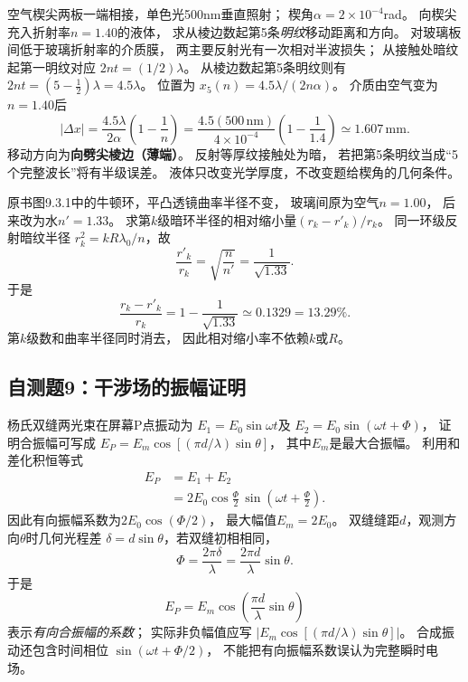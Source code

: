 \problemtext 空气楔尖两板一端相接，单色光500nm垂直照射；
楔角$\alpha=2\times10^{-4}$rad。
向楔尖充入折射率$n=1.40$的液体，
求从棱边数起第5条\emph{明纹}移动距离和方向。
\workings
对玻璃板间低于玻璃折射率的介质膜，
两主要反射光有一次相对半波损失；
从接触处暗纹起第一明纹对应
$2nt=(1/2)\lambda$。
从棱边数起第5条明纹则有
$2nt=(5-\tfrac12)\lambda=4.5\lambda$。
位置为
$x_5(n)=4.5\lambda/(2n\alpha)$。
介质由空气变为$n=1.40$后
\[
\boxed{|\Delta x|
=\frac{4.5\lambda}{2\alpha}\left(1-\frac1n\right)
=\frac{4.5(500\,\mathrm{nm})}{4\times10^{-4}}
 \left(1-\frac1{1.4}\right)
\simeq1.607\,\mathrm{mm}}.
\]
移动方向为\textbf{向劈尖棱边（薄端）}。
\crosscheck 反射等厚纹接触处为暗，
若把第5条明纹当成“5个完整波长”将有半级误差。
液体只改变光学厚度，不改变题给楔角的几何条件。

\problemtext 原书图9.3.1中的牛顿环，平凸透镜曲率半径不变，
玻璃间原为空气$n=1.00$，
后来改为水$n'=1.33$。
求第$k$级暗环半径的相对缩小量$(r_k-r'_k)/r_k$。
\workings
同一环级反射暗纹半径
$r_k^2=kR\lambda_0/n$，故
\[
 \frac{r'_k}{r_k}=\sqrt{\frac{n}{n'}}
 =\frac1{\sqrt{1.33}}.
\]
于是
\[
\boxed{\frac{r_k-r'_k}{r_k}
=1-\frac1{\sqrt{1.33}}\simeq0.1329=13.29\%}.
\]
\crosscheck 第$k$级数和曲率半径同时消去，
因此相对缩小率不依赖$k$或$R$。

\subsection{自测题9：干涉场的振幅证明}

\problemtext 杨氏双缝两光束在屏幕P点振动为
$E_1=E_0\sin\omega t$及
$E_2=E_0\sin(\omega t+\Phi)$，
证明合振幅可写成
$E_P=E_m\cos[(\pi d/\lambda)\sin\theta]$，
其中$E_m$是最大合振幅。
\workings
利用和差化积恒等式
\[
\begin{aligned}
E_P&=E_1+E_2\\
&=2E_0\cos\frac\Phi2\,
 \sin\left(\omega t+\frac\Phi2\right).
\end{aligned}
\]
因此有向振幅系数为$2E_0\cos(\Phi/2)$，
最大幅值$E_m=2E_0$。
双缝缝距$d$，观测方向$\theta$时几何光程差
$\delta=d\sin\theta$，若双缝初相相同，
\[
\Phi=\frac{2\pi\delta}{\lambda}
=\frac{2\pi d}{\lambda}\sin\theta.
\]
于是
\[
\boxed{E_P=E_m\cos\left(\frac{\pi d}{\lambda}\sin\theta\right)}
\]
表示\emph{有向合振幅的系数}；
实际非负幅值应写
$|E_m\cos[(\pi d/\lambda)\sin\theta]|$。
\crosscheck 合成振动还包含时间相位
$\sin(\omega t+\Phi/2)$，
不能把有向振幅系数误认为完整瞬时电场。

